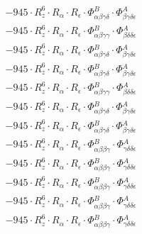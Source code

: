 \documentclass{article}
\begin{document}
\begin{subequations}
\begin{gather}
\begin{array}{c}
 \\[0.2em] 		 - 945 \cdot R_{z}^{6} \cdot R_{\alpha{}} \cdot R_{\epsilon{}} \cdot \Phi{}^{B}_{\alpha{}\beta{}\gamma{}\delta{}} \cdot \Phi{}^{A}_{\beta{}\gamma{}\delta{}\epsilon{}} 
 \\[0.2em] 		 - 945 \cdot R_{z}^{6} \cdot R_{\alpha{}} \cdot R_{\epsilon{}} \cdot \Phi{}^{B}_{\alpha{}\beta{}\gamma{}\gamma{}} \cdot \Phi{}^{A}_{\beta{}\delta{}\delta{}\epsilon{}} 
 \\[0.2em] 		 - 945 \cdot R_{z}^{6} \cdot R_{\alpha{}} \cdot R_{\epsilon{}} \cdot \Phi{}^{B}_{\alpha{}\beta{}\gamma{}\delta{}} \cdot \Phi{}^{A}_{\beta{}\gamma{}\delta{}\epsilon{}} 
 \\[0.2em] 		 - 945 \cdot R_{z}^{6} \cdot R_{\alpha{}} \cdot R_{\epsilon{}} \cdot \Phi{}^{B}_{\alpha{}\beta{}\gamma{}\delta{}} \cdot \Phi{}^{A}_{\beta{}\gamma{}\delta{}\epsilon{}} 
 \\[0.2em] 		 - 945 \cdot R_{z}^{6} \cdot R_{\alpha{}} \cdot R_{\epsilon{}} \cdot \Phi{}^{B}_{\alpha{}\beta{}\gamma{}\gamma{}} \cdot \Phi{}^{A}_{\beta{}\delta{}\delta{}\epsilon{}} 
 \\[0.2em] 		 - 945 \cdot R_{z}^{6} \cdot R_{\alpha{}} \cdot R_{\epsilon{}} \cdot \Phi{}^{B}_{\alpha{}\beta{}\gamma{}\delta{}} \cdot \Phi{}^{A}_{\beta{}\gamma{}\delta{}\epsilon{}} 
 \\[0.2em] 		 - 945 \cdot R_{z}^{6} \cdot R_{\alpha{}} \cdot R_{\epsilon{}} \cdot \Phi{}^{B}_{\alpha{}\beta{}\gamma{}\delta{}} \cdot \Phi{}^{A}_{\beta{}\gamma{}\delta{}\epsilon{}} 
 \\[0.2em] 		 - 945 \cdot R_{z}^{6} \cdot R_{\alpha{}} \cdot R_{\epsilon{}} \cdot \Phi{}^{B}_{\alpha{}\beta{}\beta{}\gamma{}} \cdot \Phi{}^{A}_{\gamma{}\delta{}\delta{}\epsilon{}} 
 \\[0.2em] 		 - 945 \cdot R_{z}^{6} \cdot R_{\alpha{}} \cdot R_{\epsilon{}} \cdot \Phi{}^{B}_{\alpha{}\beta{}\beta{}\gamma{}} \cdot \Phi{}^{A}_{\gamma{}\delta{}\delta{}\epsilon{}} 
 \\[0.2em] 		 - 945 \cdot R_{z}^{6} \cdot R_{\alpha{}} \cdot R_{\epsilon{}} \cdot \Phi{}^{B}_{\alpha{}\beta{}\beta{}\gamma{}} \cdot \Phi{}^{A}_{\gamma{}\delta{}\delta{}\epsilon{}} 
 \\[0.2em] 		 - 945 \cdot R_{z}^{6} \cdot R_{\alpha{}} \cdot R_{\epsilon{}} \cdot \Phi{}^{B}_{\alpha{}\beta{}\beta{}\gamma{}} \cdot \Phi{}^{A}_{\gamma{}\delta{}\delta{}\epsilon{}} 
 \\[0.2em] 		 - 945 \cdot R_{z}^{6} \cdot R_{\alpha{}} \cdot R_{\epsilon{}} \cdot \Phi{}^{B}_{\alpha{}\beta{}\beta{}\gamma{}} \cdot \Phi{}^{A}_{\gamma{}\delta{}\delta{}\epsilon{}} 

\end{array}
\end{gather}
\end{subequations}
\end{document}
